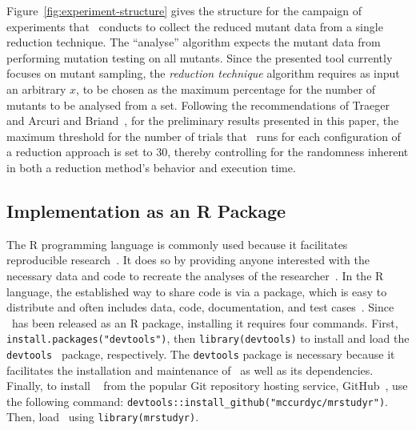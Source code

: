 Figure~\ref{fig:experiment-structure} gives the structure for the campaign of experiments that \mr~conducts to collect
the reduced mutant data from a single reduction technique. The ``analyse'' algorithm expects the mutant data from
performing mutation testing on all mutants. Since the presented tool currently focuses on mutant sampling, the
\textit{reduction technique} algorithm requires as input an arbitrary $x$, to be chosen as the maximum percentage for
the number of mutants to be analysed from a set. Following the recommendations of Traeger~\etal~\cite{traeger2008nine}
and Arcuri and Briand~\cite{arcuri2014hitchhiker}, for the preliminary results presented in this paper, the maximum
threshold for the number of trials that \mr~runs for each configuration of a reduction approach is set to 30, thereby
controlling for the randomness inherent in both a reduction method's behavior and execution time.

\subsection{Implementation as an R Package}


The R programming language is commonly used because it facilitates reproducible research~\cite{Kapfhammer2011,
Kapfhammer2016}. It does so by providing anyone interested with the necessary data and code to recreate the analyses of
the researcher~\cite{gentleman2012statistical}. In the R language, the established way to share code is via a package,
which is easy to distribute and often includes data, code, documentation, and test cases~\cite{wickham2015r}. Since
\mr~has been released as an R package, installing it requires four commands. First, \texttt{install.packages("devtools")},
then {\small\texttt{library(devtools)}} to install and load the {\small\texttt{devtools}}~\cite{devtools} package,
respectively. The \texttt{devtools} package is necessary because it facilitates the installation and maintenance of
\mr~as well as its dependencies. Finally, to install \mr~\cite{tool} from the popular Git repository hosting service,
GitHub~\cite{github}, use the following command: {\small\texttt{devtools::install\_github("mccurdyc/mrstudyr")}}. Then,
load \mr~using \texttt{library(mrstudyr)}.


